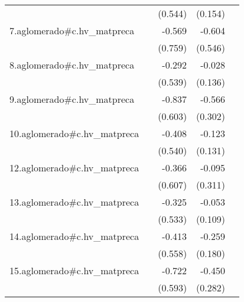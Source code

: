 {\begin{longtable}{l*{4}{D{.}{.}{-1}}}
            &                     &     (0.544)         &     (0.154)         &                     \\
\addlinespace
7.aglomerado#c.hv\_matpreca&                     &      -0.569         &      -0.604         &                     \\
            &                     &     (0.759)         &     (0.546)         &                     \\
\addlinespace
8.aglomerado#c.hv\_matpreca&                     &      -0.292         &      -0.028         &                     \\
            &                     &     (0.539)         &     (0.136)         &                     \\
\addlinespace
9.aglomerado#c.hv\_matpreca&                     &      -0.837         &      -0.566         &                     \\
            &                     &     (0.603)         &     (0.302)         &                     \\
\addlinespace
10.aglomerado#c.hv\_matpreca&                     &      -0.408         &      -0.123         &                     \\
            &                     &     (0.540)         &     (0.131)         &                     \\
\addlinespace
12.aglomerado#c.hv\_matpreca&                     &      -0.366         &      -0.095         &                     \\
            &                     &     (0.607)         &     (0.311)         &                     \\
\addlinespace
13.aglomerado#c.hv\_matpreca&                     &      -0.325         &      -0.053         &                     \\
            &                     &     (0.533)         &     (0.109)         &                     \\
\addlinespace
14.aglomerado#c.hv\_matpreca&                     &      -0.413         &      -0.259         &                     \\
            &                     &     (0.558)         &     (0.180)         &                     \\
\addlinespace
15.aglomerado#c.hv\_matpreca&                     &      -0.722         &      -0.450         &                     \\
            &                     &     (0.593)         &     (0.282)         &                     \\

\end{longtable}}
